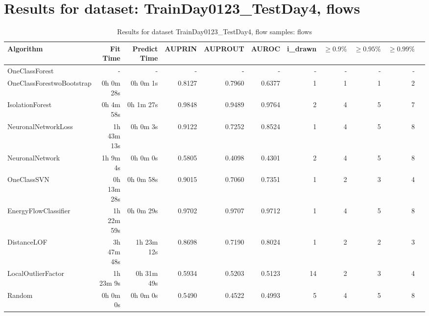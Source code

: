 \documentclass{article}
\begin{document}
\section*{Results for dataset: TrainDay0123_TestDay4, flows}
\begin{table}[h!]
\centering
\caption{Results for dataset TrainDay0123_TestDay4, flow samples: flows}
\begin{tabular}{lrrrrrrrrrr}
\toprule
Algorithm & Fit Time & Predict Time & AUPRIN & AUPROUT & AUROC & i\_drawn & $\geq 0.9\%$ & $\geq 0.95\%$ & $\geq 0.99\%$ \\
\midrule
OneClassForest & - & - & - & - & - & - & - & - & - \\
OneClassForestwoBootstrap & 0h 0m 28s & 0h 0m 1s & 0.8127 & 0.7960 & 0.6377 & 1 & 1 & 1 & 2 \\
IsolationForest & 0h 4m 58s & 0h 1m 27s & 0.9848 & 0.9489 & 0.9764 & 2 & 4 & 5 & 7 \\
NeuronalNetworkLoss & 1h 43m 13s & 0h 0m 3s & 0.9122 & 0.7252 & 0.8524 & 1 & 4 & 5 & 8 \\
NeuronalNetwork & 1h 9m 4s & 0h 0m 0s & 0.5805 & 0.4098 & 0.4301 & 2 & 4 & 5 & 8 \\
OneClassSVN & 0h 13m 28s & 0h 0m 58s & 0.9015 & 0.7060 & 0.7351 & 1 & 2 & 3 & 4 \\
EnergyFlowClassifier & 1h 22m 59s & 0h 0m 29s & 0.9702 & 0.9707 & 0.9712 & 1 & 4 & 5 & 8 \\
DistanceLOF & 3h 47m 48s & 1h 23m 12s & 0.8698 & 0.7190 & 0.8024 & 1 & 2 & 2 & 3 \\
LocalOutlierFactor & 1h 23m 9s & 0h 31m 49s & 0.5934 & 0.5203 & 0.5123 & 14 & 2 & 3 & 4 \\
Random & 0h 0m 0s & 0h 0m 0s & 0.5490 & 0.4522 & 0.4993 & 5 & 4 & 5 & 8 \\
\bottomrule
\end{tabular}
\end{table}
\end{document}
